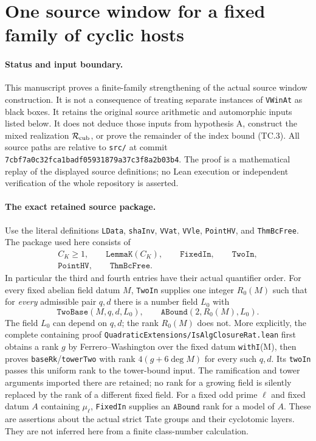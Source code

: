 \section{One source window for a fixed family of cyclic hosts}
\label{sec:cubic-abelian-common-window}

\paragraph{Status and input boundary.}
This manuscript proves a finite-family strengthening of the actual
source window construction.  It is not a consequence of treating
separate instances of \texttt{VWinAt} as black boxes.
It retains the original source arithmetic and automorphic inputs
listed below.  It does not deduce those inputs from hypothesis A,
construct the mixed realization $\mathcal R_{\rm cub}$, or prove
the remainder of the index bound (TC.3).
All source paths are relative to \texttt{src/} at commit
\texttt{7cbf7a0c32fca1badf05931879a37c3f8a2b03b4}.
The proof is a mathematical replay of the displayed source definitions;
no Lean execution or independent verification of the whole repository
is asserted.

\paragraph{The exact retained source package.}
Use the literal definitions \texttt{LData}, \texttt{shaInv},
\texttt{VVat}, \texttt{VVle}, \texttt{PointHV}, and
\texttt{ThmBcFree}.  The package used here consists of
\[
 \begin{gathered}
 C_K\geq1,\qquad \texttt{LemmaK}(C_K),\qquad
 \texttt{FixedIn},\qquad\texttt{TwoIn},\\
 \texttt{PointHV},\qquad\texttt{ThmBcFree}.
 \end{gathered}                                                   \tag{AW.1}
\]
In particular the third and fourth entries have their actual
quantifier order.  For every fixed abelian field datum $M$,
\texttt{TwoIn} supplies one integer $R_0(M)$ such that for
\emph{every} admissible pair $q,d$ there is a number field $L_0$ with
\[
 \texttt{TwoBase}(M,q,d,L_0),\qquad
 \texttt{ABound}(2,R_0(M),L_0).                                  \tag{AW.2}
\]
The field $L_0$ can depend on $q,d$; the rank $R_0(M)$ does not.
More explicitly, the complete containing proof
\texttt{QuadraticExtensions/IsAlgClosureRat.lean} first obtains a
rank $g$ by Ferrero--Washington over the fixed datum
\texttt{withI}(M), then proves \texttt{baseRk}/\texttt{towerTwo}
with rank $4(g+6\deg M)$ for every such $q,d$.
Its \texttt{twoIn} passes this uniform rank to the tower-bound
input.  The ramification and tower arguments imported there are
retained; no rank for a growing field is silently replaced by
the rank of a different fixed field.
For a fixed odd prime $\ell$ and fixed datum $A$ containing
$\mu_\ell$, \texttt{FixedIn} supplies an $\texttt{ABound}$
rank for a model of $A$.  These are assertions about the actual
strict Tate groups and their cyclotomic layers.
They are not inferred here from a finite class-number calculation.

